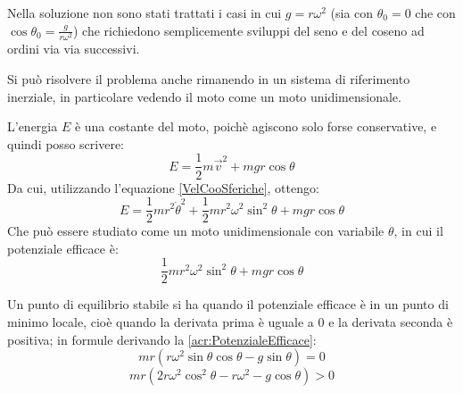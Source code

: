 \documentclass[../main.tex]{subfiles}
\begin{document}
Nella soluzione non sono stati trattati i casi in cui $g=r\omega^2$ 
(sia con $\theta_0=0$ che con $\cos\theta_0=\frac{g}{r\omega^2}$) che richiedono semplicemente
sviluppi del seno e del coseno ad ordini via via successivi.


\solution[2]
Si può risolvere il problema anche rimanendo in un sistema di riferimento inerziale, in particolare vedendo
il moto come un moto unidimensionale.

L'energia $E$ è una costante del moto, poichè agiscono solo forse conservative, e quindi posso scrivere:
\begin{equation*}
	E=\frac{1}{2}m\overrightarrow{v}^2+mgr\cos\theta
\end{equation*}
Da cui, utilizzando l'equazione \cref{VelCooSferiche}, ottengo:
\begin{equation*}
	E=\frac{1}{2}mr^2\dot{\theta}^2+\frac{1}{2}mr^2\omega^2\sin^2\theta+mgr\cos\theta
\end{equation*}
Che può essere studiato come un moto unidimensionale con variabile $\theta$, in cui il potenziale
efficace è:
\begin{equation}\label{acr:PotenzialeEfficace}
	\frac{1}{2}mr^2\omega^2\sin^2\theta+mgr\cos\theta
\end{equation}

Un punto di equilibrio stabile si ha quando il potenziale efficace è in un punto di minimo locale, cioè
quando la derivata prima è uguale a 0 e la derivata seconda è positiva; in formule derivando la
\cref{acr:PotenzialeEfficace}:
\begin{equation}
	mr\left( r\omega^2\sin\theta\cos\theta-g\sin\theta \right)=0
\end{equation}
\begin{equation}
	mr\left( 2r\omega^2\cos^2\theta-r\omega^2-g\cos\theta \right)>0
\end{equation}
\end{document}
